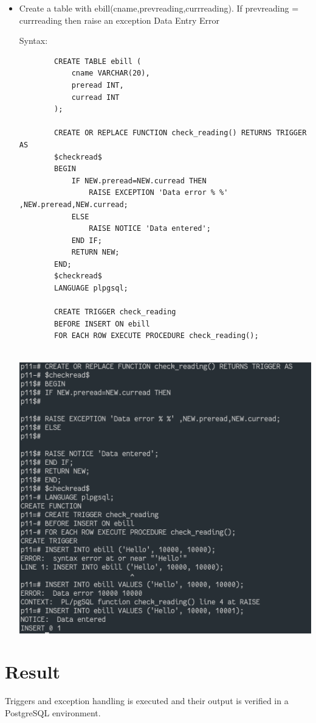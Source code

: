 \documentclass[13pt,oneside]{book}
\begin{document}
\begin{itemize}
	
	\item
	Create a table with ebill(cname,prevreading,currreading). If prevreading
= currreading then raise an exception Data Entry Error
	 
	Syntax:
	\begin{verbatim}
		CREATE TABLE ebill (
			cname VARCHAR(20),
			preread INT,
			curread INT
		);
		
		CREATE OR REPLACE FUNCTION check_reading() RETURNS TRIGGER AS
		$checkread$
		BEGIN
			IF NEW.preread=NEW.curread THEN
				RAISE EXCEPTION 'Data error % %' ,NEW.preread,NEW.curread;
			ELSE
				RAISE NOTICE 'Data entered';
			END IF;
			RETURN NEW;
		END;
		$checkread$
		LANGUAGE plpgsql;
		
		CREATE TRIGGER check_reading
		BEFORE INSERT ON ebill
		FOR EACH ROW EXECUTE PROCEDURE check_reading();
	
	\end{verbatim}
	\includegraphics[]{img/p10/ss7.png}
	

	
\end{itemize}
\section*{Result}
	Triggers and exception handling is executed and their output
	is verified in a PostgreSQL environment.
\end{document}
